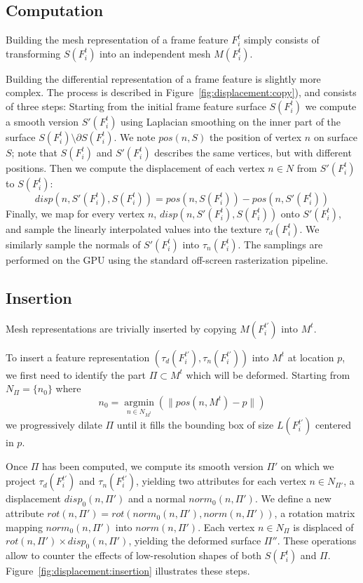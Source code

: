 \subsection{Computation}
\label{sec:representation:computation}

Building the mesh representation of a frame feature $F^t_i$ simply consists of transforming $S(F^t_i)$ into an independent mesh $M(F^t_i)$.

Building the differential representation of a frame feature is slightly more complex.
The process is described in Figure~\ref{fig:displacement:copy}), and consists of three steps:
Starting from the initial frame feature surface $S(F^t_i)$ we compute a smooth version $S'(F^t_i)$ using Laplacian smoothing on the inner part of the surface $S(F^t_i) \setminus \partial S(F^t_i)$.
We note $pos(n, S)$ the position of vertex $n$ on surface $S$; note that $S(F^t_i)$ and $S'(F^t_i)$ describes the same vertices, but with different positions.
Then we compute the displacement of each vertex $n \in N$ from $S'(F^t_i)$ to $S(F^t_i)$:
\begin{equation}
    disp(n,S'(F^t_i), S(F^t_i) ) = pos(n, S(F^t_i)) - pos(n, S'(F^t_i))
\end{equation}
Finally, we map for every vertex $n$, $disp(n,S'(F^t_i), S(F^t_i))$ onto $S'(F^t_i)$, and sample the linearly interpolated values into the texture $\tau_d(F^t_i)$.
We similarly sample the normals of $S'(F^t_i)$ into $\tau_n(F^t_i)$.
The samplings are performed on the GPU using the standard off-screen rasterization pipeline.

\subsection{Insertion}
\label{sec:representation:insertion}

Mesh representations are trivially inserted by copying $M(F^{t'}_i)$ into $M^t$.

To insert a feature representation $(\tau_d(F^{t'}_i), \tau_n(F^{t'}_i))$ into $M^t$ at location $p$, we first need to identify the part $\Pi \subset M^t$ which will be deformed.
Starting from $N_{\Pi} = \{n_0\}$ where
\begin{equation}
n_0=\underset{n\in N_{M^t}}{\operatorname{argmin}}(\|pos(n, M^t) - p\|)
\end{equation}
we progressively dilate $\Pi$ until it fills the bounding box of size $L(F^{t'}_i)$ centered in $p$.

Once $\Pi$ has been computed, we compute its smooth version $\Pi'$ on which we project $\tau_d(F^{t'}_i)$ and $\tau_n(F^{t'}_i)$, yielding two attributes for each vertex $n \in N_{\Pi'}$, a displacement $disp_0(n, \Pi')$ and a normal $norm_0(n, \Pi')$.
We define a new attribute $rot(n, \Pi') = rot(norm_0(n, \Pi'), norm(n, \Pi'))$, a rotation matrix mapping $norm_0(n, \Pi')$ into $norm(n, \Pi')$.
Each vertex $n \in N_{\Pi}$ is displaced of $rot(n, \Pi') \times disp_0(n, \Pi')$, yielding the deformed surface $\Pi''$.
These operations allow to counter the effects of low-resolution shapes of both $S(F^t_i)$ and $\Pi$. Figure~\ref{fig:displacement:insertion} illustrates these steps.

